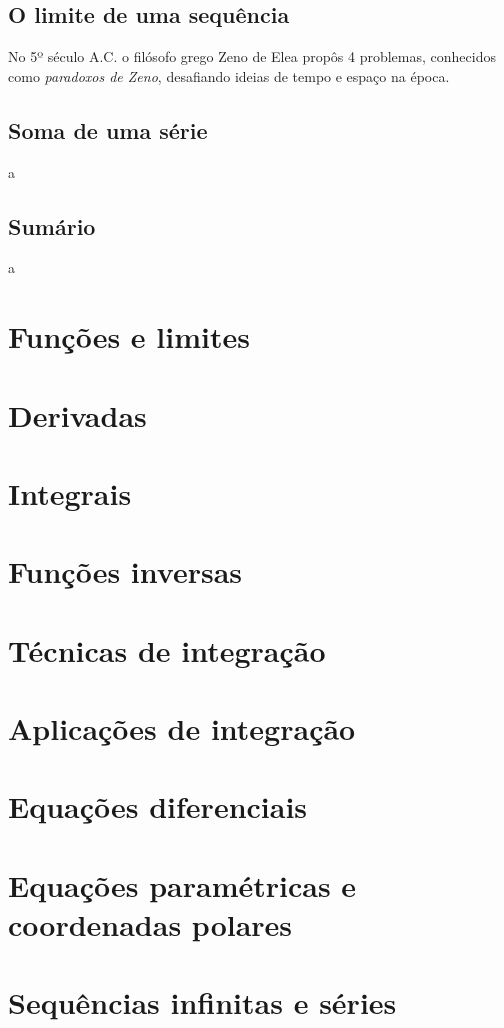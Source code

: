 \subsection{O limite de uma sequência}
No 5º século A.C. o filósofo grego Zeno de Elea propôs 4 problemas, conhecidos como \emph{paradoxos de Zeno}, desafiando ideias de tempo e espaço na época.
\subsection{Soma de uma série}
a
\subsection{Sumário}
a

\section{Funções e limites}
\section{Derivadas}
\section{Integrais}
\section{Funções inversas}
\section{Técnicas de integração}
\section{Aplicações de integração}
\section{Equações diferenciais}
\section{Equações paramétricas e coordenadas polares}
\section{Sequências infinitas e séries}
